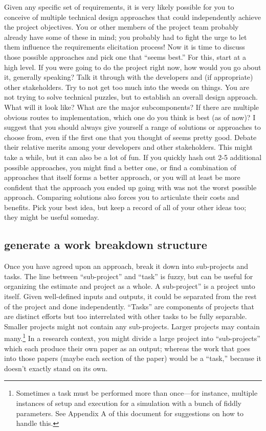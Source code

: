 \documentclass[12pt,oneside]{book}
\begin{document}
Given any specific set of requirements, it is very likely possible for you to conceive of multiple technical design approaches that could independently achieve the project objectives. You or other members of the project team probably already have some of these in mind; you probably had to fight the urge to let them influence the requirements elicitation process! Now it is time to discuss those possible approaches and pick one that ``seems best.''
For this, start at a high level. If you were going to do the project right now, how would you go about it, generally speaking? Talk it through with the developers and (if appropriate) other stakeholders. Try to not get too much into the weeds on things. You are not trying to solve technical puzzles, but to establish an overall design approach. What will it look like? What are the major subcomponents? If there are multiple obvious routes to implementation, which one do you think is best (as of now)?
I suggest that you should always give yourself a range of solutions or approaches to choose from, even if the first one that you thought of seems pretty good. Debate their relative merits among your developers and other stakeholders. This might take a while, but it can also be a lot of fun. If you quickly hash out 2-5 additional possible approaches, you might find a better one, or find a combination of approaches that itself forms a better approach, or you will at least be more confident that the approach you ended up going with was not the worst possible approach. Comparing solutions also forces you to articulate their costs and benefits. Pick your best idea, but keep a record of all of your other ideas too; they might be useful someday.

\subsection*{generate a work breakdown structure}

Once you have agreed upon an approach, break it down into sub-projects and tasks. The line between ``sub-project'' and ``task'' is fuzzy, but can be useful for organizing the estimate and project as a whole. A sub-project'' is a project unto itself. Given well-defined inputs and outputs, it could be separated from the rest of the project and done independently. ``Tasks'' are components of projects that are distinct efforts but too interrelated with other tasks to be fully separable. Smaller projects might not contain any sub-projects. Larger projects may contain many.\footnote{
Sometimes a task must be performed more than once—for instance, multiple instances of setup and execution for a simulation with a bunch of fiddly parameters. See Appendix A of this document for suggestions on how to handle this.} 
In a research context, you might divide a large project into ``sub-projects'' which each produce their own paper as an output; whereas the work that goes into those papers (maybe each section of the paper) would be a ``task,'' because it doesn't exactly stand on its own.
\end{document}
